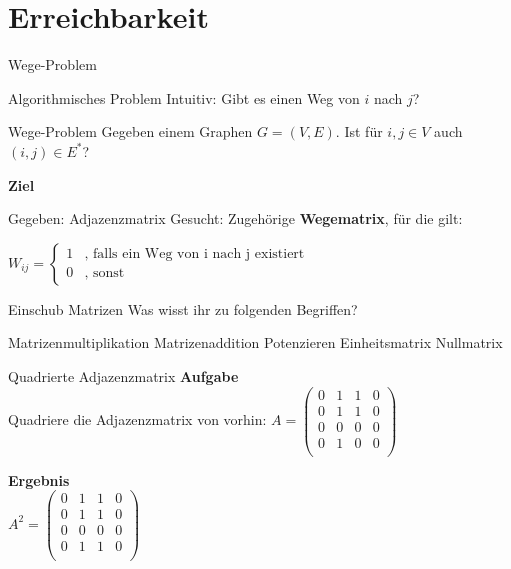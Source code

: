 \section{Erreichbarkeit}
\begin{frame}{Wege-Problem}
	\begin{itemize}
		\pitem Algorithmisches Problem
		\pitem Intuitiv: Gibt es einen Weg von $i$ nach $j$?
	\end{itemize}

	\pause
	
	\begin{block}{Wege-Problem}
		Gegeben einem Graphen $G = (V,E)$. Ist für $i,j \in V$ auch $(i,j) \in E^*$?
	\end{block}

	\pause

	\textbf{Ziel}\\
	\begin{itemize}
		\pitem Gegeben: Adjazenzmatrix
		\pitem Gesucht: Zugehörige \textbf{Wegematrix}, für die gilt:
	\end{itemize}

	\pause

	$W_{ij} = \begin{cases} 
	1 & \text{, falls ein Weg von i nach j existiert}\\
	0 & \text{, sonst}
	\end{cases}$
\end{frame}

\begin{frame}{Einschub Matrizen}
	Was wisst ihr zu folgenden Begriffen?
	
	\begin{itemize}
		\pitem Matrizenmultiplikation
		\pitem Matrizenaddition
		\pitem Potenzieren
		\pitem Einheitsmatrix
		\pitem Nullmatrix
	\end{itemize}
\end{frame}

\begin{frame}{Quadrierte Adjazenzmatrix}
	\textbf{Aufgabe}\\
	Quadriere die Adjazenzmatrix von vorhin:
	$ A =
	\begin{pmatrix}
	0&1&1&0\\
	0&1&1&0\\
	0&0&0&0\\
	0&1&0&0\\
	\end{pmatrix}	
	$
	\pause 
	
	\textbf{Ergebnis}\\
	$ A^2 =
	\begin{pmatrix}
	0&1&1&0\\
	0&1&1&0\\
	0&0&0&0\\
	0&1&1&0\\
	\end{pmatrix}	
	$
\end{frame}

